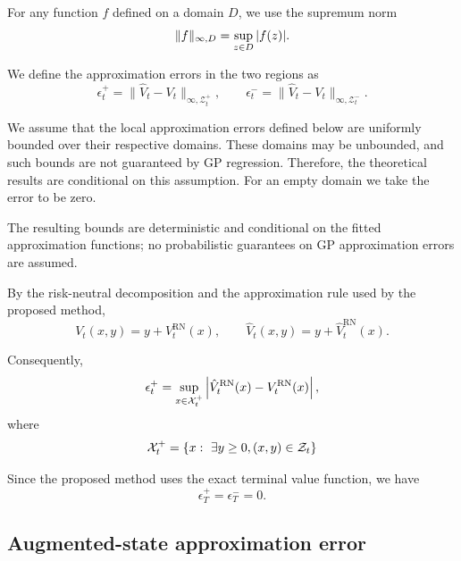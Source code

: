 For any function $f$ defined on a domain $D$, we use the supremum norm
\begin{equation}
	\|f\|_{\infty,D} = \sup_{z\in D}|f(z)|.
	\notag
	\label{supnorm}
\end{equation}

We define the approximation errors in the two regions as
\begin{equation}
	\epsilon_t^+ = \| \hat{V}_t - V_t \|_{\infty, \mathcal{Z}_t^+}, \qquad
	\epsilon_t^- = \| \hat{V}_t - V_t \|_{\infty, \mathcal{Z}_t^-}.
	\label{decomposed-errors}
\end{equation}

We assume that the local approximation errors defined below are uniformly bounded over their respective domains. These domains may be unbounded, and such bounds are not guaranteed by GP regression. Therefore, the theoretical results are conditional on this assumption. For an empty domain we take the error to be zero.

The resulting bounds are deterministic and conditional on
the fitted approximation functions; no probabilistic
guarantees on GP approximation errors are assumed.

By the risk-neutral decomposition and the approximation rule used by the proposed method,
\begin{equation}
	V_t(x,y)=y+V_t^{\text{RN}}(x),
	\qquad
	\hat{V}_t(x,y)=y+\hat{V}_t^{\text{RN}}(x).
	\label{value-rn-decomposition}
\end{equation}

Consequently,
\begin{equation}
	\epsilon_t^+ = \sup_{x \in \mathcal{X}_t^+} \left| \hat{V}_t^{\text{RN}}(x) - V_t^{\text{RN}}(x) \right|,
	\notag
	\label{positive-error}
\end{equation}
where
\begin{equation}
	\mathcal{X}_t^+ = \{ x:\ \exists y \geq 0, (x, y) \in \mathcal{Z}_t \}
	\notag
	\label{positive-x-state}
\end{equation}

Since the proposed method uses the exact terminal value function, we have
\begin{equation}
	\epsilon_T^+ = \epsilon_T^- = 0.
	\label{terminal-error}
\end{equation}

\subsection{Augmented-state approximation error}
\label{theory:approximation-error}

